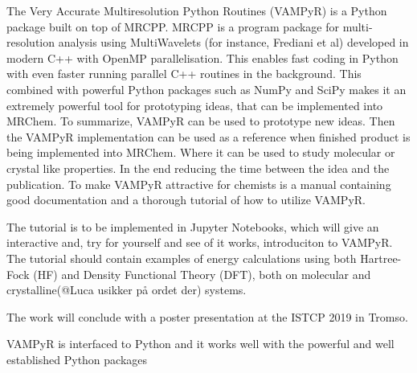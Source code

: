 \documentclass[12pt]{article}
\begin{document}
The Very Accurate Multiresolution Python Routines (VAMPyR\cite{vampyr})
is a Python package built on top of MRCPP\cite{mrcpp}. MRCPP is a program
package for multi-resolution analysis using MultiWavelets
(for instance, Frediani et al\cite{frediani2013fully})
developed in modern C++ with OpenMP parallelisation.
This enables fast coding in Python with even faster
running parallel C++ routines in the background. This combined with
powerful Python packages such as NumPy\cite{numpy} and SciPy\cite{SciPy}
makes it an extremely powerful tool for prototyping ideas, that can be implemented
into MRChem\cite{mrchem}. To summarize, VAMPyR can be used to prototype
new ideas. Then the VAMPyR implementation can be used as a reference when
finished product is being implemented into MRChem\cite{mrchem}. Where it can
be used to study molecular or crystal like properties. In the end reducing
the time between the idea and the publication. To make VAMPyR attractive
for chemists is a manual containing good documentation and a thorough tutorial
of how to utilize VAMPyR.

The tutorial is to be implemented in Jupyter Notebooks, which will
give an interactive and, try for yourself and see of it works,
introduciton to VAMPyR.
The tutorial should contain examples of energy calculations using
both Hartree-Fock (HF) and Density Functional Theory (DFT), both on
molecular and crystalline(@Luca usikker på ordet der) systems.

The work will conclude with a poster presentation at the ISTCP
2019\cite{istcp} in Tromso.

VAMPyR is interfaced to Python and it works well
with the powerful and well established Python packages




\end{document}
